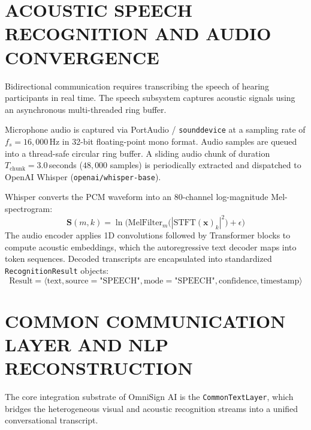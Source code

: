 \documentclass[12pt,a4paper]{report}
\begin{document}
\section{ACOUSTIC SPEECH RECOGNITION AND AUDIO CONVERGENCE} \label{sec:impl-speech}
Bidirectional communication requires transcribing the speech of hearing participants in real time. The speech subsystem captures acoustic signals using an asynchronous multi-threaded ring buffer.

Microphone audio is captured via PortAudio / \texttt{sounddevice} at a sampling rate of $f_s = 16{,}000$\,Hz in 32-bit floating-point mono format. Audio samples are queued into a thread-safe circular ring buffer. A sliding audio chunk of duration $T_{\text{chunk}} = 3.0$\,seconds ($48{,}000$ samples) is periodically extracted and dispatched to OpenAI Whisper (\texttt{openai/whisper-base}).

Whisper converts the PCM waveform into an 80-channel log-magnitude Mel-spectrogram:
\begin{equation}
\mathbf{S}(m, k) = \ln\Big( \text{MelFilter}_m \big( |\text{STFT}(\mathbf{x})_k|^2 \big) + \epsilon \Big)
\end{equation}
The audio encoder applies 1D convolutions followed by Transformer blocks to compute acoustic embeddings, which the autoregressive text decoder maps into token sequences. Decoded transcripts are encapsulated into standardized \texttt{RecognitionResult} objects:
\begin{equation}
\text{Result} = \big\langle \text{text}, \text{source}=\text{"SPEECH"}, \text{mode}=\text{"SPEECH"}, \text{confidence}, \text{timestamp} \big\rangle
\end{equation}

\section{COMMON COMMUNICATION LAYER AND NLP RECONSTRUCTION} \label{sec:impl-ccl}
The core integration substrate of OmniSign AI is the \texttt{CommonTextLayer}, which bridges the heterogeneous visual and acoustic recognition streams into a unified conversational transcript.
\end{document}
